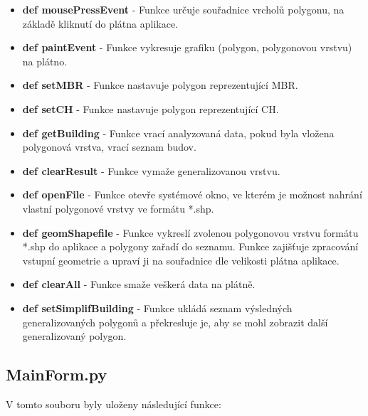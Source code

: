 \documentclass[12pt, a4paper]{article}
\begin{document}
\begin{itemize}
    \item \textbf{def mousePressEvent} - Funkce určuje souřadnice vrcholů polygonu, na základě kliknutí do plátna aplikace.
    \item \textbf{def paintEvent} - Funkce vykresuje grafiku (polygon, polygonovou vrstvu) na plátno. 
    \item \textbf{def setMBR} - Funkce nastavuje polygon reprezentující MBR. 
    \item \textbf{def setCH} - Funkce nastavuje polygon reprezentující CH.
    \item \textbf{def getBuilding} - Funkce vrací analyzovaná data, pokud byla vložena polygonová vrstva, vrací seznam budov. 
    \item \textbf{def clearResult} - Funkce vymaže generalizovanou vrstvu. 
    \item \textbf{def openFile} - Funkce otevře systémové okno, ve kterém je možnost nahrání vlastní polygonové vrstvy ve formátu *.shp.
    \item \textbf{def geomShapefile} - Funkce vykreslí zvolenou polygonovou vrstvu formátu *.shp do aplikace a polygony zařadí do seznamu. Funkce zajišťuje zpracování vstupní geometrie a upraví ji na souřadnice dle velikosti plátna aplikace. 
    \item \textbf{def clearAll} - Funkce smaže veškerá data na plátně.
    \item \textbf{def setSimplifBuilding} - Funkce ukládá seznam výsledných generalizovaných polygonů a překresluje je, aby se mohl zobrazit další generalizovaný polygon.
\end{itemize}

\newpage
\subsection*{MainForm.py}
\vspace{3mm}
V tomto souboru byly uloženy následující funkce:
\vspace{3mm}
\end{document}
